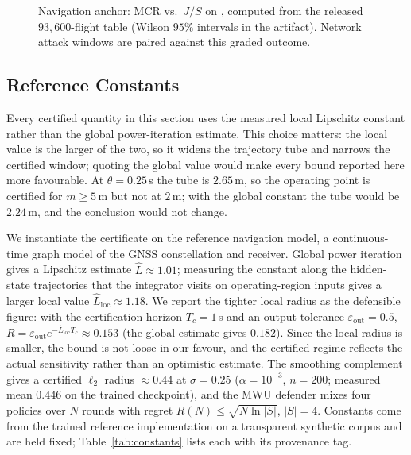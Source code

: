 \begin{figure}[t]
\centering
{}
\caption{Navigation anchor: MCR vs.\ $J/S$ on ,
computed from the released $93{,}600$-flight table (Wilson $95\%$ intervals in
the artifact). Network attack windows are paired against this graded
outcome.}
\label{fig:mcr}
\end{figure}

\subsection{Reference Constants}
Every certified quantity in this section uses the measured local Lipschitz
constant rather than the global power-iteration estimate. This choice matters:
the local value is the larger of the two, so it widens the trajectory tube and
narrows the certified window; quoting the global value would make every bound
reported here more favourable. At $\theta{=}0.25$\,s the tube is $2.65$\,m, so
the operating point is certified for $m\ge5$\,m but not at $2$\,m; with the
global constant the tube would be $2.24$\,m, and the conclusion would not
change.

We instantiate the certificate on the reference navigation model, a
continuous-time graph model of the GNSS constellation and receiver. Global
power iteration gives a Lipschitz estimate $\hat L\approx1.01$; measuring the
constant along the hidden-state trajectories that the integrator visits on
operating-region inputs gives a larger local value
$\hat L_{\mathrm{loc}}\approx1.18$. We report the tighter local radius as the
defensible figure: with the certification horizon $T_c=1$\,s and an output
tolerance $\varepsilon_{\mathrm{out}}=0.5$,
$R=\varepsilon_{\mathrm{out}}e^{-\hat L_{\mathrm{loc}}T_c}\approx0.153$ (the
global estimate gives $0.182$). Since the local radius is smaller, the bound
is not loose in our favour, and the certified regime reflects the actual
sensitivity rather than an optimistic estimate. The
smoothing complement gives a certified $\ell_2$ radius $\approx0.44$ at
$\sigma=0.25$ ($\alpha=10^{-3}$, $n=200$; measured mean $0.446$ on the trained
checkpoint), and the MWU defender mixes four policies over $N$ rounds with regret
$R(N)\le\sqrt{N\ln|S|}$, $|S|=4$. Constants come from the trained reference
implementation on a transparent synthetic corpus and are held fixed;
Table~\ref{tab:constants} lists each with its provenance tag.

